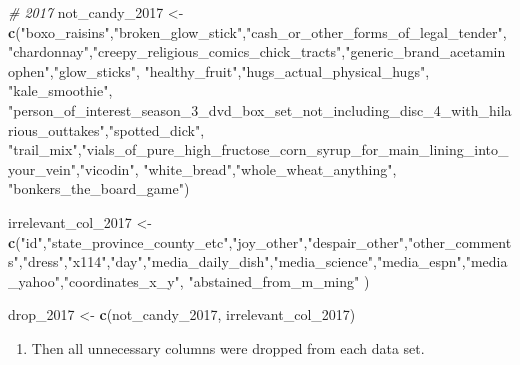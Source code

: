 \documentclass[
]{article}
\newenvironment{Shaded}{\begin{snugshade}}{\end{snugshade}}
\newcommand{\CommentTok}[1]{\textcolor[rgb]{0.56,0.35,0.01}{\textit{#1}}}
\newcommand{\FunctionTok}[1]{\textcolor[rgb]{0.13,0.29,0.53}{\textbf{#1}}}
\newcommand{\NormalTok}[1]{#1}
\newcommand{\OtherTok}[1]{\textcolor[rgb]{0.56,0.35,0.01}{#1}}
\newcommand{\StringTok}[1]{\textcolor[rgb]{0.31,0.60,0.02}{#1}}
\providecommand{\tightlist}{%
  \setlength{\itemsep}{0pt}\setlength{\parskip}{0pt}}
\begin{document}
\begin{Shaded}
\begin{Highlighting}[]
\CommentTok{\# 2017}
\NormalTok{not\_candy\_2017 }\OtherTok{\textless{}{-}} \FunctionTok{c}\NormalTok{(}\StringTok{"boxo\_raisins"}\NormalTok{,}\StringTok{"broken\_glow\_stick"}\NormalTok{,}\StringTok{"cash\_or\_other\_forms\_of\_legal\_tender"}\NormalTok{, }\StringTok{"chardonnay"}\NormalTok{,}\StringTok{"creepy\_religious\_comics\_chick\_tracts"}\NormalTok{,}\StringTok{"generic\_brand\_acetaminophen"}\NormalTok{,}\StringTok{"glow\_sticks"}\NormalTok{, }\StringTok{"healthy\_fruit"}\NormalTok{,}\StringTok{"hugs\_actual\_physical\_hugs"}\NormalTok{, }\StringTok{"kale\_smoothie"}\NormalTok{, }\StringTok{"person\_of\_interest\_season\_3\_dvd\_box\_set\_not\_including\_disc\_4\_with\_hilarious\_outtakes"}\NormalTok{,}\StringTok{"spotted\_dick"}\NormalTok{, }\StringTok{"trail\_mix"}\NormalTok{,}\StringTok{"vials\_of\_pure\_high\_fructose\_corn\_syrup\_for\_main\_lining\_into\_your\_vein"}\NormalTok{,}\StringTok{"vicodin"}\NormalTok{, }\StringTok{"white\_bread"}\NormalTok{,}\StringTok{"whole\_wheat\_anything"}\NormalTok{, }\StringTok{"bonkers\_the\_board\_game"}\NormalTok{)}
  
\NormalTok{irrelevant\_col\_2017 }\OtherTok{\textless{}{-}} \FunctionTok{c}\NormalTok{(}\StringTok{"id"}\NormalTok{,}\StringTok{"state\_province\_county\_etc"}\NormalTok{,}\StringTok{"joy\_other"}\NormalTok{,}\StringTok{"despair\_other"}\NormalTok{,}\StringTok{"other\_comments"}\NormalTok{,}\StringTok{"dress"}\NormalTok{,}\StringTok{"x114"}\NormalTok{,}\StringTok{"day"}\NormalTok{,}\StringTok{"media\_daily\_dish"}\NormalTok{,}\StringTok{"media\_science"}\NormalTok{,}\StringTok{"media\_espn"}\NormalTok{,}\StringTok{"media\_yahoo"}\NormalTok{,}\StringTok{"coordinates\_x\_y"}\NormalTok{, }\StringTok{"abstained\_from\_m\_ming"}
\NormalTok{)}

\NormalTok{drop\_2017 }\OtherTok{\textless{}{-}} \FunctionTok{c}\NormalTok{(not\_candy\_2017, irrelevant\_col\_2017)}
\end{Highlighting}
\end{Shaded}

\begin{enumerate}
\def\labelenumi{\arabic{enumi}.}
\setcounter{enumi}{3}
\tightlist
\item
  Then all unnecessary columns were dropped from each data set.
\end{enumerate}
\end{document}
